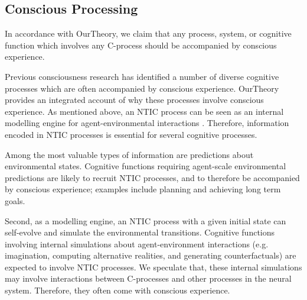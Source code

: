 \documentclass[utf8]{article}
\begin{document}
                
                
                



		\subsection{Conscious Processing}\label{sec:conscious processing}
		    In accordance with \ac{OurTheory}, we claim that any process, system, or cognitive function which involves any C-process should be accompanied by conscious experience. 
		    
		    Previous consciousness research has identified a number of diverse cognitive processes which are often accompanied by conscious experience. \ac{OurTheory} provides an integrated account of why these processes involve conscious experience. As mentioned above, an NTIC process can be seen as an internal modelling engine for agent-environmental interactions \citep{BERTSCHINGER.2006}. Therefore, information encoded in NTIC processes is essential for several cognitive processes. 
		    
		    Among the most valuable types of information are predictions about environmental states. Cognitive functions requiring agent-scale environmental predictions are likely to recruit NTIC processes, and to therefore be accompanied by conscious experience; examples include planning and achieving long term goals.	
		    
            
            Second, as a modelling engine, an NTIC process with a given initial state can self-evolve and simulate the environmental transitions. Cognitive functions involving internal simulations about agent-environment interactions (e.g. imagination, computing alternative realities, and generating counterfactuals) are expected to involve NTIC processes. We speculate that, these internal simulations may involve interactions between C-processes and other processes in the neural system. Therefore, they often come with conscious experience.
            
\end{document}
